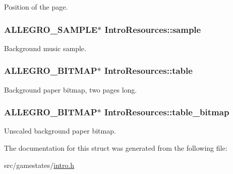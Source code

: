 Position of the page. \hypertarget{structIntroResources_adaa339b0f793f6c2b9f78fa2d97e1795}{
\subsubsection[{sample}]{\setlength{\rightskip}{0pt plus 5cm}A\+L\+L\+E\+G\+R\+O\+\_\+\+S\+A\+M\+P\+L\+E$\ast$ Intro\+Resources\+::sample}}\label{structIntroResources_adaa339b0f793f6c2b9f78fa2d97e1795}
Background music sample. \hypertarget{structIntroResources_aafe9aebd6a8e398bd2ff4b05109b280e}{
\subsubsection[{table}]{\setlength{\rightskip}{0pt plus 5cm}A\+L\+L\+E\+G\+R\+O\+\_\+\+B\+I\+T\+M\+A\+P$\ast$ Intro\+Resources\+::table}}\label{structIntroResources_aafe9aebd6a8e398bd2ff4b05109b280e}
Background paper bitmap, two pages long. \hypertarget{structIntroResources_a4e1e3ab13d0809643cfc394acb2aa301}{
\subsubsection[{table\+\_\+bitmap}]{\setlength{\rightskip}{0pt plus 5cm}A\+L\+L\+E\+G\+R\+O\+\_\+\+B\+I\+T\+M\+A\+P$\ast$ Intro\+Resources\+::table\+\_\+bitmap}}\label{structIntroResources_a4e1e3ab13d0809643cfc394acb2aa301}
Unscaled background paper bitmap. 

The documentation for this struct was generated from the following file\+:\begin{DoxyCompactItemize}
\item 
src/gamestates/\hyperlink{intro_8h}{intro.\+h}\end{DoxyCompactItemize}
